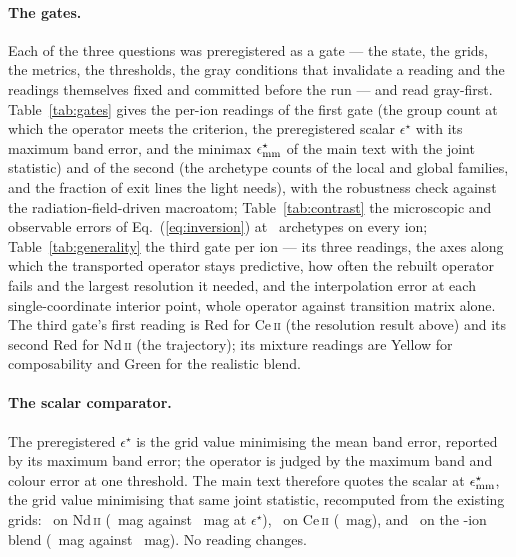 \documentclass[aps,prl,twocolumn,superscriptaddress,nofootinbib,longbibliography]{revtex4-2}
\begin{document}
\paragraph{The gates.} Each of the three questions was preregistered as a
gate --- the state, the grids, the metrics, the thresholds, the gray
conditions that invalidate a reading and the readings themselves fixed and
committed before the run --- and read gray-first.
Table~\ref{tab:gates} gives the per-ion readings of the first gate (the
group count at which the operator meets the criterion, the preregistered
scalar $\epsilon^\star$ with its maximum band error, and the minimax
$\epsilon^\star_{\rm mm}$ of the main text with the joint statistic) and
of the second (the archetype counts of the local and global
families, and the fraction of exit lines the light needs), with the
robustness check against the radiation-field-driven macroatom;
Table~\ref{tab:contrast} the microscopic and observable errors of
Eq.~(\ref{eq:inversion}) at \PBContrastK\ archetypes on every ion;
Table~\ref{tab:generality} the third gate per ion --- its three readings,
the axes along which the transported operator stays predictive, how often
the rebuilt operator fails and the largest resolution it needed, and the
interpolation error at each single-coordinate interior point, whole
operator against transition matrix alone. The third gate's first reading
is Red for Ce\,\textsc{ii} (the resolution result above) and its second Red
for Nd\,\textsc{ii} (the trajectory); its mixture readings are Yellow for
composability and Green for the realistic blend.

\paragraph{The scalar comparator.} The preregistered $\epsilon^\star$ is
the grid value minimising the mean band error, reported by its maximum
band error; the operator is judged by the maximum band and colour error at
one threshold. The main text therefore quotes the scalar at
$\epsilon^\star_{\rm mm}$, the grid value minimising that same joint
statistic, recomputed from the existing grids: \PBNdEpsMM\ on
Nd\,\textsc{ii} (\PBNdEpsMMErr~mag against \PBNdEpsErr~mag at
$\epsilon^\star$), \PBCeEpsMM\ on Ce\,\textsc{ii} (\PBCeEpsMMErr~mag),
and \PBBlendEpsMM\ on the \PBBlendNIons-ion blend (\PBBlendEpsMMErr~mag
against \PBBlendEpsErr~mag). No reading changes.
\end{document}
